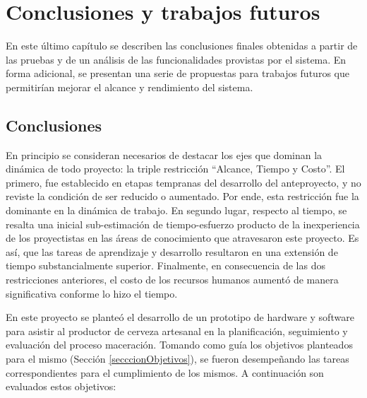 \chapter{Conclusiones y trabajos futuros}
\par
En este último capítulo se describen las conclusiones finales obtenidas a partir de las pruebas y de un análisis de las funcionalidades provistas por el sistema. En forma adicional, se presentan una serie de propuestas para trabajos futuros que permitirían mejorar el alcance y rendimiento del sistema.

\section{Conclusiones} %

\par En principio se consideran necesarios de destacar los ejes que dominan la dinámica de todo proyecto: la triple restricción ``Alcance, Tiempo y Costo''. El primero, fue establecido en etapas tempranas del desarrollo del anteproyecto, y no reviste la condición de ser reducido o aumentado. Por ende, esta restricción fue la dominante en la dinámica de trabajo. En segundo lugar, respecto al tiempo, se resalta una inicial sub-estimación de tiempo-esfuerzo producto de la inexperiencia de los proyectistas en las áreas de conocimiento que atravesaron este proyecto. Es así, que las tareas de aprendizaje y desarrollo resultaron en una extensión de tiempo substancialmente superior. Finalmente, en consecuencia de las dos restricciones anteriores, el costo de los recursos humanos aumentó de manera significativa conforme lo hizo el tiempo.

\par En este proyecto se planteó el desarrollo de un prototipo de hardware y software para asistir al productor de cerveza artesanal en la planificación, seguimiento y evaluación del proceso maceración. Tomando como guía los objetivos planteados para el mismo (Sección \ref{secccionObjetivos}), se fueron desempeñando las tareas correspondientes para el cumplimiento de los mismos. A continuación son evaluados estos objetivos:


